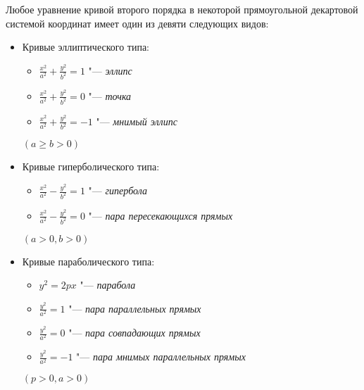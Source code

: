 \begin{theorem}
	Любое уравнение кривой второго порядка в некоторой прямоугольной декартовой системой координат имеет один из девяти следующих видов:
	\begin{itemize}
		\item Кривые эллиптического типа:
		\begin{itemize}
			\item $\frac{x^2}{a^2} + \frac{y^2}{b^2} = 1$ "--- \textit{эллипс}
			\item $\frac{x^2}{a^2} + \frac{y^2}{b^2} = 0$ "--- \textit{точка}
			\item $\frac{x^2}{a^2} + \frac{y^2}{b^2} = -1$ "--- \textit{мнимый эллипс}
		\end{itemize}
		$(a \ge b > 0)$
		\item Кривые гиперболического типа:
		\begin{itemize}
			\item $\frac{x^2}{a^2} - \frac{y^2}{b^2} = 1$ "--- \textit{гипербола}
			\item $\frac{x^2}{a^2} - \frac{y^2}{b^2} = 0$ "--- \textit{пара пересекающихся прямых}
		\end{itemize}
		$(a  > 0, b > 0)$
		\item Кривые параболического типа:
		\begin{itemize}
			\item $y^2 = 2px$ "--- \textit{парабола}
			\item $\frac{y^2}{a^2} = 1$ "--- \textit{пара параллельных прямых}
			\item $\frac{y^2}{a^2} = 0$ "--- \textit{пара совпадающих прямых}
			\item $\frac{y^2}{a^2} = -1$ "--- \textit{пара мнимых параллельных прямых}
		\end{itemize}
		$(p > 0, a > 0)$
	\end{itemize}
\end{theorem}

